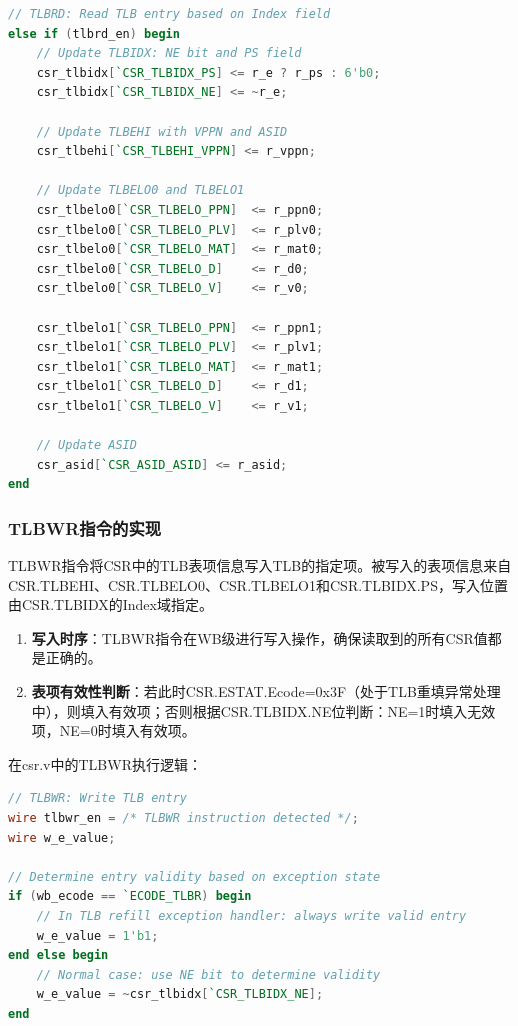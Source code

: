 \begin{lstlisting}[language=Verilog, caption=TLBRD执行逻辑]
// TLBRD: Read TLB entry based on Index field
else if (tlbrd_en) begin
    // Update TLBIDX: NE bit and PS field
    csr_tlbidx[`CSR_TLBIDX_PS] <= r_e ? r_ps : 6'b0;
    csr_tlbidx[`CSR_TLBIDX_NE] <= ~r_e;
    
    // Update TLBEHI with VPPN and ASID
    csr_tlbehi[`CSR_TLBEHI_VPPN] <= r_vppn;
    
    // Update TLBELO0 and TLBELO1
    csr_tlbelo0[`CSR_TLBELO_PPN]  <= r_ppn0;
    csr_tlbelo0[`CSR_TLBELO_PLV]  <= r_plv0;
    csr_tlbelo0[`CSR_TLBELO_MAT]  <= r_mat0;
    csr_tlbelo0[`CSR_TLBELO_D]    <= r_d0;
    csr_tlbelo0[`CSR_TLBELO_V]    <= r_v0;
    
    csr_tlbelo1[`CSR_TLBELO_PPN]  <= r_ppn1;
    csr_tlbelo1[`CSR_TLBELO_PLV]  <= r_plv1;
    csr_tlbelo1[`CSR_TLBELO_MAT]  <= r_mat1;
    csr_tlbelo1[`CSR_TLBELO_D]    <= r_d1;
    csr_tlbelo1[`CSR_TLBELO_V]    <= r_v1;
    
    // Update ASID
    csr_asid[`CSR_ASID_ASID] <= r_asid;
end
\end{lstlisting}


\subsubsection{TLBWR指令的实现}

TLBWR指令将CSR中的TLB表项信息写入TLB的指定项。被写入的表项信息来自CSR.TLBEHI、CSR.TLBELO0、CSR.TLBELO1和CSR.TLBIDX.PS，写入位置由CSR.TLBIDX的Index域指定。

\begin{enumerate}
    \item \textbf{写入时序}：TLBWR指令在WB级进行写入操作，确保读取到的所有CSR值都是正确的。
    
    \item \textbf{表项有效性判断}：若此时CSR.ESTAT.Ecode=0x3F（处于TLB重填异常处理中），则填入有效项；否则根据CSR.TLBIDX.NE位判断：NE=1时填入无效项，NE=0时填入有效项。
    
\end{enumerate}

在csr.v中的TLBWR执行逻辑：

\begin{lstlisting}[language=Verilog, caption=TLBWR表项有效性处理]
// TLBWR: Write TLB entry
wire tlbwr_en = /* TLBWR instruction detected */;
wire w_e_value;

// Determine entry validity based on exception state
if (wb_ecode == `ECODE_TLBR) begin
    // In TLB refill exception handler: always write valid entry
    w_e_value = 1'b1;
end else begin
    // Normal case: use NE bit to determine validity
    w_e_value = ~csr_tlbidx[`CSR_TLBIDX_NE];
end
\end{lstlisting}


